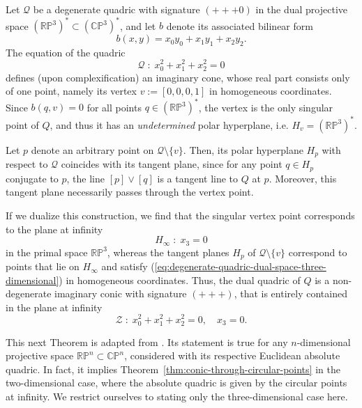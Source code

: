 \documentclass[10pt, a4paper]{article}
\theoremstyle{BoldTopSpacing}
\theoremstyle{BoldTopSpacing}
\theoremstyle{BoldTopSpacing}
\theoremstyle{BoldTopBottomSpacing}
\theoremstyle{BoldTopSpacing}
\theoremstyle{BoldTopBottomSpacing}
\theoremstyle{remark}
\begin{document}
Let $\mathcal{Q}$ be a degenerate quadric with signature $(+ + + 0)$ in the dual projective space $(\mathbb{R}\mathbb{P}^{3})^{*} \subset (\mathbb{C}\mathbb{P}^{3})^{*}$, and let $b$ denote its associated bilinear form
\[
    b(x, y) = x_{0} y_{0} + x_{1} y_{1} + x_{2} y_{2}.
\]
The equation of the quadric
\begin{equation}
\label{eq:degenerate-quadric-dual-space-three-dimensional}
    \mathcal{Q} \; : \; x_{0}^2 + x_{1}^2 + x_{2}^2 = 0
\end{equation}
defines (upon complexification) an imaginary cone, whose real part consists only of one point, namely its vertex $v := [0, 0, 0, 1]$ in homogeneous coordinates. Since $b(q, v) = 0$ for all points $q \in (\mathbb{R}\mathbb{P}^{3})^{*}$, the vertex is the only singular point of $Q$, and thus it has an \textit{undetermined} polar hyperplane, i.e. $H_{v} =  (\mathbb{R}\mathbb{P}^{3})^{*}$. \par
Let $p$ denote an arbitrary point on $\mathcal{Q} \setminus \{v\}$. Then, its polar hyperplane $H_{p}$ with respect to $\mathcal{Q}$ coincides with its tangent plane, since for any point $q \in H_{p}$ conjugate to $p$, the line $[p] \vee [q]$ is a tangent line to $Q$ at $p$. Moreover, this tangent plane necessarily passes through the vertex point. \par
If we dualize this construction, we find that the singular vertex point corresponds to the plane at infinity
\[
    H_{\infty} \; : \; x_{3} = 0
\]
in the primal space $\mathbb{R}\mathbb{P}^3$, whereas the tangent planes $H_{p}$ of $\mathcal{Q} \setminus \{v\}$ correspond to points that lie on $H_{\infty}$ and satisfy (\ref{eq:degenerate-quadric-dual-space-three-dimensional}) in homogeneous coordinates. Thus, the dual quadric of $Q$ is a non-degenerate imaginary conic with signature $(+ + +)$, that is entirely contained in the plane at infinity
\begin{equation}
\label{eq:absolute-conic}
\mathcal{Z} \; : \; x_{0}^2 + x_{1}^2 + x_{2}^2 = 0, \quad x_{3} = 0.
\end{equation}

This next Theorem is adapted from \cite[\textcolor{CitationColor}{Ch.~10}]{alveroAnalyticProjectiveGeometry}. Its statement is true for any $n$-dimensional projective space $\mathbb{R}\mathbb{P}^n \subset \mathbb{C}\mathbb{P}^n$, considered with its respective Euclidean absolute quadric. In fact, it implies Theorem~\ref{thm:conic-through-circular-points} in the two-dimensional case, where the absolute quadric is given by the circular points at infinity. We restrict ourselves to stating only the three-dimensional case here. \par
\end{document}
